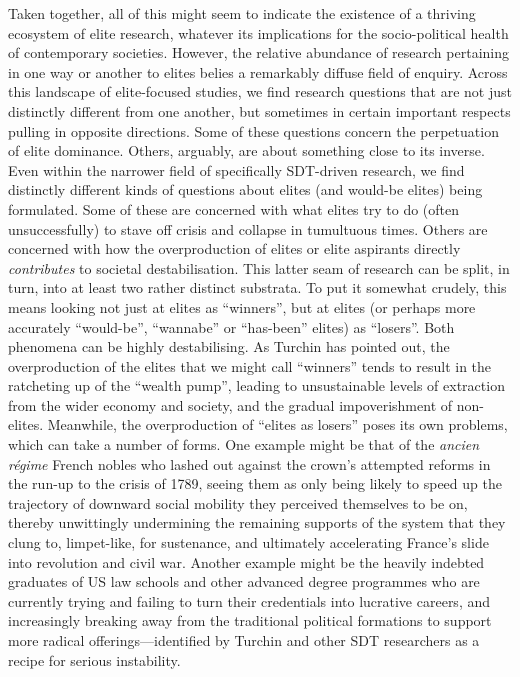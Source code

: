\documentclass[11pt,a4paper]{article}
\begin{document}
Taken together, all of this might seem to indicate the existence of a thriving ecosystem of elite research, whatever its implications for the socio-political health of contemporary societies. However, the relative abundance of research pertaining in one way or another to elites belies a remarkably diffuse field of enquiry. Across this landscape of elite-focused studies, we find research questions that are not just distinctly different from one another, but sometimes in certain important respects pulling in opposite directions. Some of these questions concern the perpetuation of elite dominance. Others, arguably, are about something close to its inverse. Even within the narrower field of specifically SDT-driven research, we find distinctly different kinds of questions about elites (and would-be elites) being formulated. Some of these are concerned with what elites try to do (often unsuccessfully) to stave off crisis and collapse in tumultuous times. Others are concerned with how the overproduction of elites or elite aspirants directly \emph{contributes} to societal destabilisation. This latter seam of research can be split, in turn, into at least two rather distinct substrata. To put it somewhat crudely, this means looking not just at elites as ``winners'', but at elites (or perhaps more accurately ``would-be'', ``wannabe'' or ``has-been'' elites) as ``losers''. Both phenomena can be highly destabilising. As Turchin has pointed out, the overproduction of the elites that we might call ``winners'' tends to result in the ratcheting up of the ``wealth pump'', leading to unsustainable levels of extraction from the wider economy and society, and the gradual impoverishment of non-elites. Meanwhile, the overproduction of ``elites as losers'' poses its own problems, which can take a number of forms. One example might be that of the \emph{ancien r\'egime} French nobles who lashed out against the crown's attempted reforms in the run-up to the crisis of 1789, seeing them as only being likely to speed up the trajectory of downward social mobility they perceived themselves to be on, thereby unwittingly undermining the remaining supports of the system that they clung to, limpet-like, for sustenance, and ultimately accelerating France's slide into revolution and civil war. Another example might be the heavily indebted graduates of US law schools and other advanced degree programmes who are currently trying and failing to turn their credentials into lucrative careers, and increasingly breaking away from the traditional political formations to support more radical offerings---identified by Turchin and other SDT researchers as a recipe for serious instability.
\end{document}
